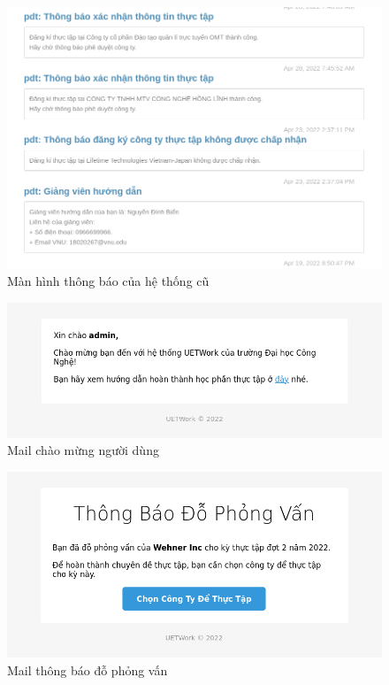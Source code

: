 \documentclass[./../main.tex]{subfiles}
\begin{document}
\begin{figure}[]
	\includegraphics[width=\linewidth]{./images/notification_old.png}
	\caption{Màn hình thông báo của hệ thống cũ}
	\label{fig:old_notification_page}
\end{figure}

\begin{figure}
  \includegraphics[width=\linewidth]{./images/mail_screenshot.png}
	\caption{Mail chào mừng người dùng}
	\label{fig:welcome_mail}
\end{figure}

\begin{figure}
  \includegraphics[width=\linewidth]{./images/complex_mail_screenshot.png}
	\caption{Mail thông báo đỗ phỏng vấn}
	\label{fig:pass_mail}
\end{figure}
\end{document}
